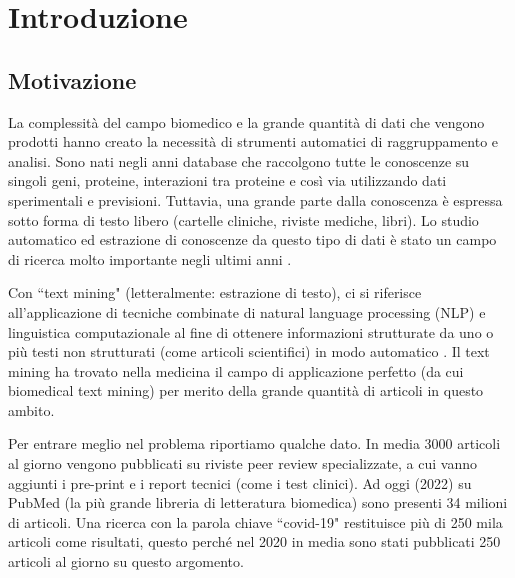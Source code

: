 \documentclass[12pt]{report}
\newcommand{\quotes}[1]{``#1"}
\begin{document}


\tableofcontents

\chapter{Introduzione}

\section{Motivazione}
La complessità del campo biomedico e la grande quantità di dati che vengono prodotti hanno creato la necessità di strumenti automatici di raggruppamento e analisi. Sono nati negli anni database che raccolgono tutte le conoscenze su singoli geni, proteine, interazioni tra proteine e così via utilizzando dati sperimentali e previsioni. Tuttavia, una grande parte dalla conoscenza è espressa sotto forma di testo libero (cartelle cliniche, riviste mediche, libri). Lo studio automatico ed estrazione di conoscenze da questo tipo di dati è stato un campo di ricerca molto importante negli ultimi anni \cite{recentadv, deepl_nlp}.

Con \quotes{text mining} (letteralmente: estrazione di testo), ci si riferisce all'applicazione di tecniche combinate di natural language processing (NLP) e linguistica computazionale al fine di ottenere informazioni strutturate da uno o più testi non strutturati (come articoli scientifici) in modo automatico \cite{miningbook}. Il text mining ha trovato nella medicina il campo di applicazione perfetto (da cui biomedical text mining) per merito della grande quantità di articoli in questo ambito. 

Per entrare meglio nel problema riportiamo qualche dato. In media 3000 articoli al giorno vengono pubblicati su riviste peer review specializzate, a cui vanno aggiunti i pre-print e i report tecnici (come i test clinici). Ad oggi (2022) su PubMed (la più grande libreria di letteratura biomedica) sono presenti 34 milioni di articoli. Una ricerca con la parola chiave \quotes{covid-19} restituisce più di 250 mila articoli come risultati, questo perché nel 2020 in media sono stati pubblicati 250 articoli al giorno su questo argomento. \cite{covidpapers} 
\end{document}
